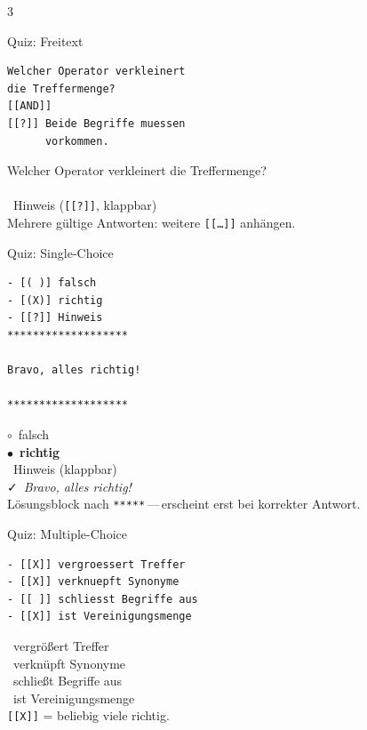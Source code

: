 \documentclass[a4paper,landscape,9pt]{extarticle}
\newcommand{\prevsm}[1]{{\footnotesize\color{muted} #1}}
\begin{document}
\begin{multicols}{3}
\begin{liacard}{Quiz: Freitext}
\begin{lstlisting}[language=lia]
Welcher Operator verkleinert
die Treffermenge?
[[AND]]
[[?]] Beide Begriffe muessen
      vorkommen.
\end{lstlisting}
\tcblower
\prevsm{Welcher Operator verkleinert die Treffermenge?\\[2pt]
\fbox{\strut\hspace{6em}}\\[3pt]
\faQuestionCircle~Hinweis (\texttt{[[?]]}, klappbar)\\[2pt]
{\footnotesize Mehrere gültige Antworten: weitere \texttt{[[\dots]]} anhängen.}}
\end{liacard}

\begin{liacard}{Quiz: Single-Choice}
\begin{lstlisting}[language=lia]
- [( )] falsch
- [(X)] richtig
- [[?]] Hinweis
*******************

Bravo, alles richtig!

*******************
\end{lstlisting}
\tcblower
\prevsm{$\circ$~falsch\\
$\bullet$~\textbf{richtig}\\
\faQuestionCircle~Hinweis (klappbar)\\[3pt]
{\footnotesize\color{liagreen}\faCheck~\textit{Bravo, alles richtig!}}\\[2pt]
{\footnotesize Lösungsblock nach \texttt{*****}\,---\,erscheint erst bei korrekter Antwort.}}
\end{liacard}

\begin{liacard}{Quiz: Multiple-Choice}
\begin{lstlisting}[language=lia]
- [[X]] vergroessert Treffer
- [[X]] verknuepft Synonyme
- [[ ]] schliesst Begriffe aus
- [[X]] ist Vereinigungsmenge
\end{lstlisting}
\tcblower
\prevsm{\faCheckSquare~vergrößert Treffer\\
\faCheckSquare~verknüpft Synonyme\\
\faSquare~schließt Begriffe aus\\
\faCheckSquare~ist Vereinigungsmenge\\[2pt]
{\footnotesize \texttt{[[X]]} = beliebig viele richtig.}}
\end{liacard}


\end{multicols}
\end{document}
